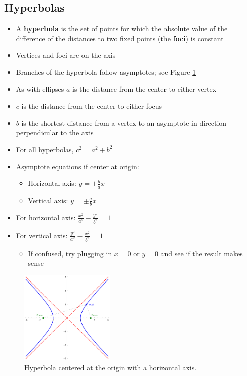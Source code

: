 \documentclass[letterpaper, 11pt, openany]{book}
\theoremstyle{mytheoremstyle}
\theoremstyle{myexamplestyle}
\begin{document}
\subsection{Hyperbolas}
\begin{itemize}
    \item A \textbf{hyperbola} is the set of points for which the absolute value of the difference of the distances to two fixed points (the \textbf{foci}) is constant
    \item Vertices and foci are on the axis
    \item Branches of the hyperbola follow asymptotes; see Figure \ref{f:hyperboladef}
    \item As with ellipses $a$ is the distance from the center to either vertex
    \item $c$ is the distance from the center to either focus
    \item $b$ is the shortest distance from a vertex to an asymptote in direction perpendicular to the axis
    \item For all hyperbolas, $c^{2} = a^{2} + b^{2}$
    \item Asymptote equations if center at origin:
    \begin{itemize}
        \item Horizontal axis: $y = \pm \frac{b}{a} x$
        \item Vertical axis: $y = \pm \frac{a}{b} x$
    \end{itemize}
    \item For horizontal axis: $\displaystyle \frac{x^{2}}{a^{2}} - \frac{y^{2}}{b^{2}} = 1$
    \item For vertical axis: $\displaystyle \frac{y^{2}}{a^{2}} - \frac{x^{2}}{b^{2}} = 1$
    \begin{itemize}
        \item If confused, try plugging in $x=0$ or $y=0$ and see if the result makes sense
    \end{itemize}
\end{itemize}

\begin{figure}[htbp]
    \centering
        \includegraphics[width = 0.4\textwidth]{Figures/hyperboladef.pdf}
    \caption{Hyperbola centered at the origin with a horizontal axis.}
    \label{f:hyperboladef}
\end{figure}
\end{document}
